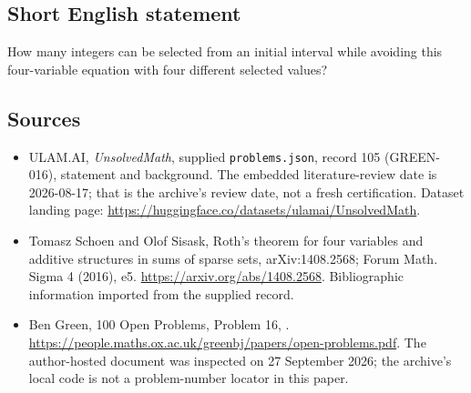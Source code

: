 \documentclass[11pt,a4paper]{article}
\begin{document}
\subsection{Short English statement}

How many integers can be selected from an initial interval while avoiding this four-variable equation with four different selected values?

\subsection{Sources}

{\small

\begin{itemize}

\item[\hypertarget{source:105:1}{S1}] ULAM.AI, \emph{UnsolvedMath}, supplied \texttt{problems.json}, record 105 (GREEN-016), statement and background. The embedded literature-review date is 2026-08-17; that is the archive’s review date, not a fresh certification. Dataset landing page: \url{https://huggingface.co/datasets/ulamai/UnsolvedMath}.

\item[\hypertarget{source:105:2}{S2}] Tomasz Schoen and Olof Sisask, Roth's theorem for four variables and additive structures in sums of sparse sets, arXiv:1408.2568; Forum Math. Sigma 4 (2016), e5. \url{https://arxiv.org/abs/1408.2568}. Bibliographic information imported from the supplied record.

\item[\hypertarget{source:105:3}{S3}] Ben Green, 100 Open Problems, Problem 16, . \url{https://people.maths.ox.ac.uk/greenbj/papers/open-problems.pdf}. The author-hosted document was inspected on 27 September 2026; the archive’s local code is not a problem-number locator in this paper.

\end{itemize}

}

\label{end:105}
\end{document}
